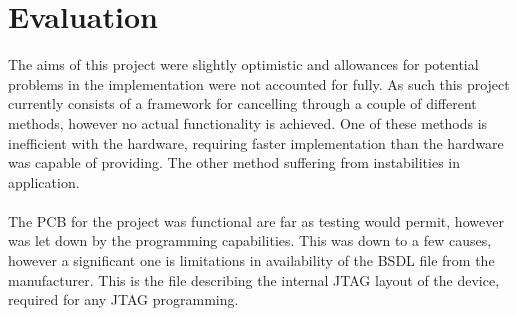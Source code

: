 \section{Evaluation}

The aims of this project were slightly optimistic and allowances for potential problems in the implementation were not accounted for fully.
As such this project currently consists of a framework for cancelling through a couple of different methods, however no actual functionality is achieved.
One of these methods is inefficient with the hardware, requiring faster implementation than the hardware was capable of providing.
The other method suffering from instabilities in application.
\\
\\
The PCB for the project was functional are far as testing would permit, however was let down by the programming capabilities.
This was down to a few causes, however a significant one is limitations in availability of the BSDL file from the manufacturer.
This is the file describing the internal JTAG layout of the device, required for any JTAG programming.

